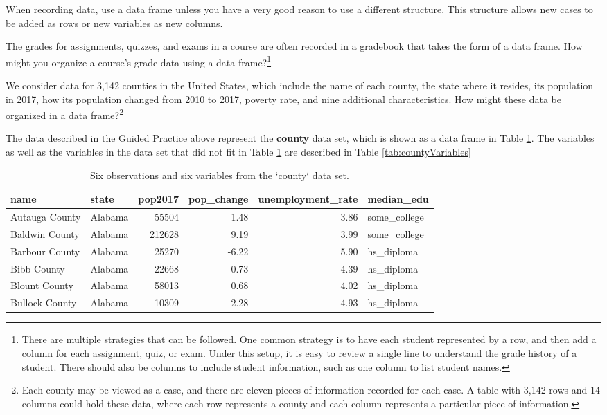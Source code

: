 \documentclass[
  10pt,
  openany]{book}
\theoremstyle{definition}
\theoremstyle{definition}
\theoremstyle{definition}
\theoremstyle{definition}
\theoremstyle{remark}
\begin{document}
When recording data, use a data frame unless you have a very good reason to use a different structure.
This structure allows new cases to be added as rows or new variables as new columns.

The grades for assignments, quizzes, and exams in a course are often recorded in a gradebook that takes the form of a data frame.
How might you organize a course's grade data using a data frame?\footnote{There are multiple strategies that can be followed. One common strategy is to have each student represented by a row, and then add a column for each assignment, quiz, or exam. Under this setup, it is easy to review a single line to understand the grade history of a student. There should also be columns to include student information, such as one column to list student names.}


We consider data for 3,142 counties in the United States,
which include the name of each county, the state where it resides, its population in 2017, how its population changed from 2010 to 2017, poverty rate, and nine additional characteristics.
How might these data be organized in a data frame?\footnote{Each county may be viewed as a case, and there are eleven pieces of information recorded for each case. A table with 3,142 rows and 14 columns could hold these data, where each row represents a county and each column represents a particular piece of information.}

The data described in the Guided Practice above represent the \textbf{county} data set, which is shown as a data frame in Table \ref{tab:countyDF}.
The variables as well as the variables in the data set that did not fit in Table \ref{tab:countyDF} are described in Table \ref{tab:countyVariables}

\begin{table}

\caption{\label{tab:countyDF}Six observations and six variables from the `county` data set.}
\centering
\begin{tabular}[t]{l|l|r|r|r|l}
\hline
name & state & pop2017 & pop\_change & unemployment\_rate & median\_edu\\
\hline
Autauga County & Alabama & 55504 & 1.48 & 3.86 & some\_college\\
\hline
Baldwin County & Alabama & 212628 & 9.19 & 3.99 & some\_college\\
\hline
Barbour County & Alabama & 25270 & -6.22 & 5.90 & hs\_diploma\\
\hline
Bibb County & Alabama & 22668 & 0.73 & 4.39 & hs\_diploma\\
\hline
Blount County & Alabama & 58013 & 0.68 & 4.02 & hs\_diploma\\
\hline
Bullock County & Alabama & 10309 & -2.28 & 4.93 & hs\_diploma\\
\hline
\end{tabular}
\end{table}
\end{document}

